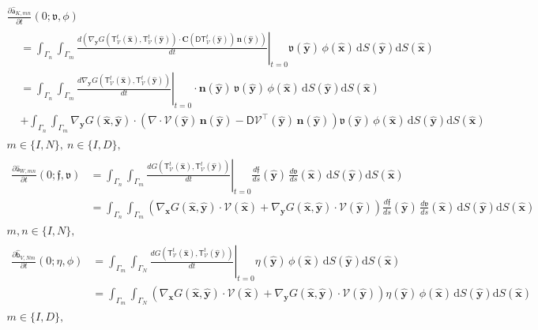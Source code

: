 \documentclass{article}
\theoremstyle{remark}
\newcommand{\T}{\mathsf{T}}
\newcommand{\aaa}{\mathsf{a}}
\newcommand{\bbb}{\mathsf{b}}
\newcommand{\hata}{\widehat{\aaa}}
\newcommand{\hatb}{\widehat{\bbb}}
\newcommand{\dd}{\mathrm{d}}
\newcommand{\n}{\boldsymbol{n}}
\newcommand{\hatx}{\widehat{\boldsymbol{x}}}
\newcommand{\haty}{\widehat{\boldsymbol{y}}}
\newcommand{\argv}{\mathfrak{v}}
\newcommand{\argf}{\mathfrak{f}}
\newcommand{\mat}[1]{\mathbf{#1}}
\newcommand{\Nu}{\mathcal{V}}
\newcommand{\DNu}{\mathsf{D}\Nu}
\newcommand{\Tt}{\T_\Nu^t}
\newcommand{\DTt}{\mathsf{DT}_\Nu^t}
\newcommand{\CDTt}[1]{\mat{C}(\DTt({#1}))}
\begin{document}
\begin{multline*}
    \frac{\partial\hata_{K,mn}}{\partial t}(0;\argv,\phi)\\
    \begin{aligned}
    &=\int_{\Gamma_n}\int_{\Gamma_m}\left.\frac{d\left(\nabla_{\boldsymbol y}G(\Tt(\hatx),\Tt(\haty))\cdot\CDTt{\haty}\,\n(\haty)\right)}{dt}\right|_{t=0}\argv(\haty)\,\phi(\hatx)\,\dd S(\haty)\dd S(\hatx)\\
    &=\int_{\Gamma_n}\int_{\Gamma_m}\left.\frac{d\nabla_{\boldsymbol y}G(\Tt(\hatx),\Tt(\haty))}{dt}\right|_{t=0}\cdot\n(\haty)\,\argv(\haty)\,\phi(\hatx)\,\dd S(\haty)\dd S(\hatx)\\
    &+\int_{\Gamma_n}\int_{\Gamma_m}\nabla_{\boldsymbol y}G(\hatx,\haty)\cdot\left(\nabla\cdot\Nu(\haty)\,\n(\haty)-\DNu^\top(\haty)\,\n(\haty)\right)\argv(\haty)\,\phi(\hatx)\,\dd S(\haty)\dd S(\hatx)
    \end{aligned}\\
    m\in\{I,N\},~n\in\{I,D\},
\end{multline*}
\begin{multline*}
    \begin{aligned}
    \frac{\partial\hata_{W,mn}}{\partial t}(0;\argf,\argv)
    &=\int_{\Gamma_n}\int_{\Gamma_m}\left.\frac{dG(\Tt(\hatx),\Tt(\haty))}{dt}\right|_{t=0}\frac{d\argf}{ds}(\haty)\,\frac{d\argv}{ds}(\hatx)\,\dd S(\haty)\dd S(\hatx)\\
    &=\int_{\Gamma_n}\int_{\Gamma_m}\left(\nabla_{\boldsymbol x}G(\hatx,\haty)\cdot\Nu(\hatx)+\nabla_{\boldsymbol y}G(\hatx,\haty)\cdot\Nu(\haty)\right)\frac{d\argf}{ds}(\haty)\,\frac{d\argv}{ds}(\hatx)\,\dd S(\haty)\dd S(\hatx)
    \end{aligned}\\
    m,n\in\{I,N\},
\end{multline*}
\begin{multline*}
    \begin{aligned}
    \frac{\partial\hatb_{V,Nm}}{\partial t}(0;\eta,\phi)
    &=\int_{\Gamma_m}\int_{\Gamma_N}\left.\frac{dG(\Tt(\hatx),\Tt(\haty))}{dt}\right|_{t=0}\eta(\haty)\,\phi(\hatx)\,\dd S(\haty)\dd S(\hatx)\\
    &=\int_{\Gamma_m}\int_{\Gamma_N}\left(\nabla_{\boldsymbol x}G(\hatx,\haty)\cdot\Nu(\hatx)+\nabla_{\boldsymbol y}G(\hatx,\haty)\cdot\Nu(\haty)\right)\eta(\haty)\,\phi(\hatx)\,\dd S(\haty)\dd S(\hatx)
    \end{aligned}\\
    m\in\{I,D\},
\end{multline*}
\end{document}
